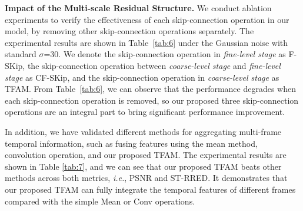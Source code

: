 \documentclass[journal]{IEEEtran}
\begin{document}

\begin{table}[htbp]
\renewcommand{\arraystretch}{1.2}
\end{table}


\noindent
\textbf{Impact of the Multi-scale Residual Structure.}
We conduct ablation experiments to verify the effectiveness of each skip-connection operation in our model, by removing other skip-connection operations separately. The experimental results are shown in Table~\ref{tab:6} under the Gaussian noise with standard $\sigma$=30. We denote the skip-connection operation in \emph{fine-level stage} as F-SKip, the skip-connection operation between \emph{coarse-level stage} and \emph{fine-level stage} as CF-SKip, and the skip-connection operation in \emph{coarse-level stage} as TFAM. From Table~\ref{tab:6}, we can observe that the performance degrades when each skip-connection operation is removed, so our proposed three skip-connection operations are an integral part to bring significant performance improvement.

In addition, we have validated different methods for aggregating multi-frame temporal information, such as fusing features using the mean method, convolution operation, and our proposed TFAM. The experimental results are shown in Table \ref{tab:7}, and we can see that our proposed TFAM beats other methods across both metrics, \emph{i.e.}, PSNR and ST-RRED. It demonstrates that our proposed TFAM can fully integrate the temporal features of different frames compared with the simple Mean or Conv operations.
\end{document}

